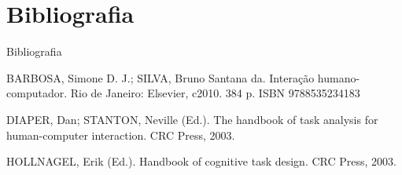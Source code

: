\documentclass[xcolor=dvipsnames]{beamer}
\begin{document}
\section{Bibliografia}

\begin{frame}{Bibliografia}
	

\begin{thebibliography}{}
	
	BARBOSA, Simone D. J.; SILVA, Bruno Santana da. Interação humano-computador. Rio de Janeiro: Elsevier, c2010. 384 p. ISBN 9788535234183

	DIAPER, Dan; STANTON, Neville (Ed.). The handbook of task analysis for human-computer interaction. CRC Press, 2003.

	HOLLNAGEL, Erik (Ed.). Handbook of cognitive task design. CRC Press, 2003.	
		
	\end{thebibliography}

\end{frame}
\end{document}
